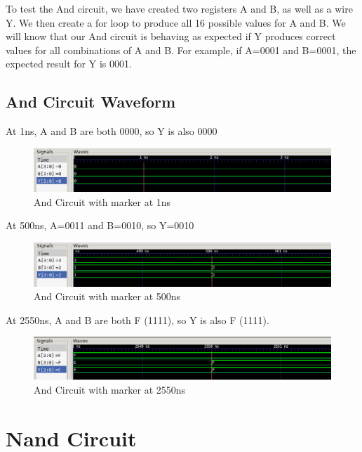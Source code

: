 \documentclass[12pt]{article}
\begin{document}
To test the And circuit, we have created two registers A and B, as well as a wire Y. We then create a for loop to produce all 16 possible values for A and B. We will know that our And circuit is behaving as expected if Y produces correct values for all combinations of A and B. For example, if A=0001 and B=0001, the expected result for Y is 0001. 
 

\subsection{And Circuit Waveform} 

At 1ns, A and B are both 0000, so Y is also 0000
\begin{figure}[H]
 \centering
 \includegraphics[width = 1.0\textwidth]{And/and_wave.png}
 \caption{And Circuit with marker at 1ns}
 \label{fig:enter-label} 
\end{figure} 

At 500ns, A=0011 and B=0010, so Y=0010
 \begin{figure}[H]
 \centering 
\includegraphics[width = 1.0\textwidth]{And/and_wave1.png}
 \caption{And Circuit with marker at 500ns}
 \label{fig:enter-label}
 \end{figure}

At 2550ns, A and B are both F (1111), so Y is also F (1111).
 \begin{figure}[H]
 \centering 
\includegraphics[width = 1.0\textwidth]{And/and_wave2.png}
 \caption{And Circuit with marker at 2550ns}
 \label{fig:enter-label}
 \end{figure}

\section{Nand Circuit}
\end{document}
